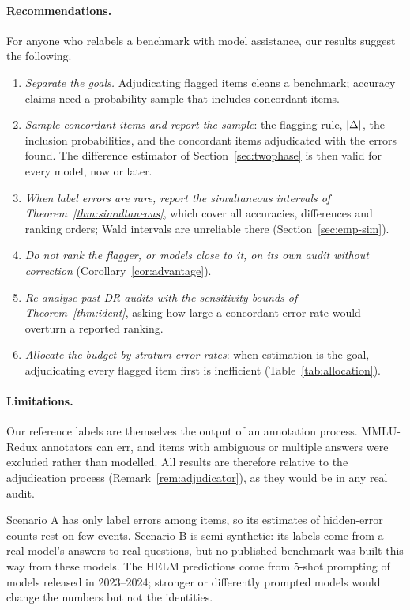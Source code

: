 \paragraph{Recommendations.} For anyone who relabels a benchmark with model assistance, our results suggest the following.
\begin{enumerate}
\item \emph{Separate the goals.} Adjudicating flagged items cleans a benchmark; accuracy claims need a probability sample that includes concordant items.
\item \emph{Sample concordant items and report the sample}: the flagging rule, $|\Delta|$, the inclusion probabilities, and the concordant items adjudicated with the errors found. The difference estimator of Section~\ref{sec:twophase} is then valid for every model, now or later.
\item \emph{When label errors are rare, report the simultaneous intervals of Theorem~\ref{thm:simultaneous}}, which cover all accuracies, differences and ranking orders; Wald intervals are unreliable there (Section~\ref{sec:emp-sim}).
\item \emph{Do not rank the flagger, or models close to it, on its own audit without correction} (Corollary~\ref{cor:advantage}).
\item \emph{Re-analyse past DR audits with the sensitivity bounds of Theorem~\ref{thm:ident}}, asking how large a concordant error rate would overturn a reported ranking.
\item \emph{Allocate the budget by stratum error rates}: when estimation is the goal, adjudicating every flagged item first is inefficient (Table~\ref{tab:allocation}).
\end{enumerate}

\paragraph{Limitations.} Our reference labels are themselves the output of an annotation process. MMLU-Redux annotators can err, and items with ambiguous or multiple answers were excluded rather than modelled. All results are therefore relative to the adjudication process (Remark~\ref{rem:adjudicator}), as they would be in any real audit.

Scenario A has only \nLabelErrA{} label errors among \nItems{} items, so its estimates of hidden-error counts rest on few events. Scenario B is semi-synthetic: its labels come from a real model's answers to real questions, but no published benchmark was built this way from these models. The HELM predictions come from 5-shot prompting of models released in 2023--2024; stronger or differently prompted models would change the numbers but not the identities.

